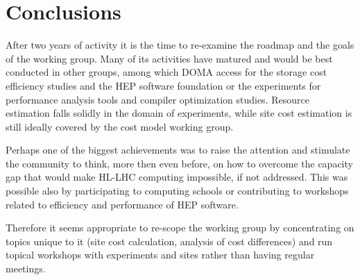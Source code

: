 \section{Conclusions}
After two years of activity it is the time to re-examine the roadmap
and the goals of the working group. Many of its activities have
matured and would be best conducted in other groups, among which DOMA
access for the storage cost efficiency studies and the HEP software
foundation or the experiments for performance analysis tools and
compiler optimization studies.  Resource estimation falls solidly in
the domain of experiments, while site cost estimation is still ideally
covered by the cost model working group.

Perhaps one of the biggest achievements was to raise the attention and
stimulate the community to think, more then even before, on how to
overcome the capacity gap that would make HL-LHC computing impossible,
if not addressed. This was possible also by participating to computing
schools or contributing to workshops related to efficiency and
performance of HEP software.

Therefore it seems appropriate to re-scope the working group by
concentrating on topics unique to it (site cost calculation, analysis
of cost differences) and run topical workshops with experiments and
sites rather than having regular meetings.
